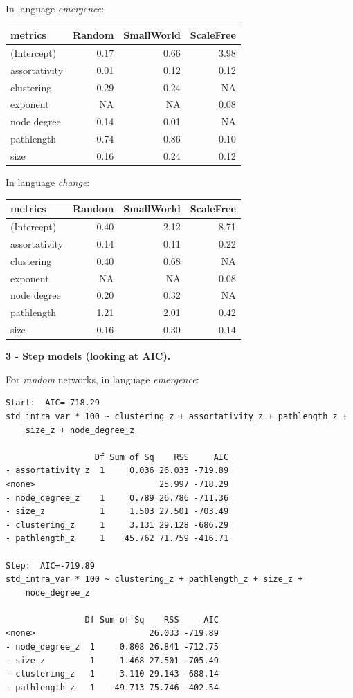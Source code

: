 \documentclass[
]{article}
\begin{document}
In language \emph{emergence}:

\begin{longtable}[]{@{}lrrr@{}}
\toprule()
metrics & Random & SmallWorld & ScaleFree \\
\midrule()
\endhead
(Intercept) & 0.17 & 0.66 & 3.98 \\
assortativity & 0.01 & 0.12 & 0.12 \\
clustering & 0.29 & 0.24 & NA \\
exponent & NA & NA & 0.08 \\
node degree & 0.14 & 0.01 & NA \\
pathlength & 0.74 & 0.86 & 0.10 \\
size & 0.16 & 0.24 & 0.12 \\
\bottomrule()
\end{longtable}

In language \emph{change}:

\begin{longtable}[]{@{}lrrr@{}}
\toprule()
metrics & Random & SmallWorld & ScaleFree \\
\midrule()
\endhead
(Intercept) & 0.40 & 2.12 & 8.71 \\
assortativity & 0.14 & 0.11 & 0.22 \\
clustering & 0.40 & 0.68 & NA \\
exponent & NA & NA & 0.08 \\
node degree & 0.20 & 0.32 & NA \\
pathlength & 1.21 & 2.01 & 0.42 \\
size & 0.16 & 0.30 & 0.14 \\
\bottomrule()
\end{longtable}

\textbf{3 - Step models (looking at AIC).}

For \emph{random} networks, in language \emph{emergence}:

\begin{verbatim}
Start:  AIC=-718.29
std_intra_var * 100 ~ clustering_z + assortativity_z + pathlength_z + 
    size_z + node_degree_z

                  Df Sum of Sq    RSS     AIC
- assortativity_z  1     0.036 26.033 -719.89
<none>                         25.997 -718.29
- node_degree_z    1     0.789 26.786 -711.36
- size_z           1     1.503 27.501 -703.49
- clustering_z     1     3.131 29.128 -686.29
- pathlength_z     1    45.762 71.759 -416.71

Step:  AIC=-719.89
std_intra_var * 100 ~ clustering_z + pathlength_z + size_z + 
    node_degree_z

                Df Sum of Sq    RSS     AIC
<none>                       26.033 -719.89
- node_degree_z  1     0.808 26.841 -712.75
- size_z         1     1.468 27.501 -705.49
- clustering_z   1     3.110 29.143 -688.14
- pathlength_z   1    49.713 75.746 -402.54
\end{verbatim}
\end{document}

